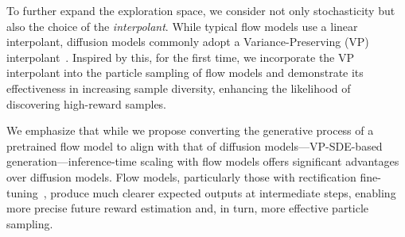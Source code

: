 To further expand the exploration space, we consider not only stochasticity but also the choice of the \emph{interpolant}. While typical flow models use a linear interpolant, diffusion models commonly adopt a Variance-Preserving (VP) interpolant~\cite{Song:2021SDE, Ho:2020DDPM}.
Inspired by this, for the first time, we incorporate the VP interpolant into the particle sampling of flow models and demonstrate its effectiveness in increasing sample diversity, enhancing the likelihood of discovering high-reward samples. 

We emphasize that while we propose converting the generative process of a pretrained flow model to align with that of diffusion models—\ie VP-SDE-based generation—inference-time scaling with flow models offers significant advantages over diffusion models. 
Flow models, particularly those with rectification fine-tuning~\cite{Liu:2023RF, liu2024instaflow}, produce much clearer expected outputs at intermediate steps, enabling more precise future reward estimation and, in turn, more effective particle sampling. 

